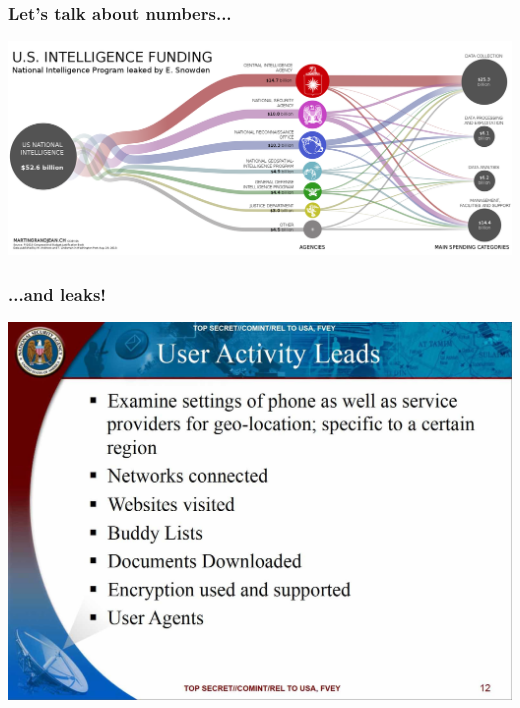 \begin{frame}
	\frametitle{Let's talk about numbers...}
	\includegraphics[width=\textwidth]{imgs/US_intelligence_budget}
\end{frame}

\begin{frame}
	\frametitle{...and leaks!}
	\begin{center}
		\includegraphics[scale=0.15]{imgs/nsa_leads}
	\end{center}
\end{frame}

